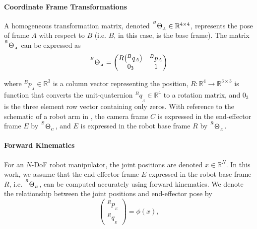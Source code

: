 \paragraph{Coordinate Frame Transformations} A homogeneous transformation matrix, denoted ${}^{^B}\Theta_{_A}\in\mathbb{R}^{4 \times 4}$, represents the pose of frame $A$ with respect to $B$ (i.e. $B$, in this case, is the base frame).
The matrix ${}^{^B}\Theta_{_A}$ can be expressed as
\begin{equation}
{}^{^B}\Theta_{_A} = 
    \begin{pmatrix}
     R\big({}^{B}q_A\big) & {}^{B}p_A \\
     0_3 & 1
    \end{pmatrix}
\end{equation}

where ${}^{B}p_{_A}\in\mathbb{R}^3$ is a column vector representing the position, $R:\mathbb{R}^4\rightarrow\mathbb{R}^{3\times 3}$ is function that converts the unit-quaternion ${}^{B}q_{_A}\in\mathbb{R}^4$ to a rotation matrix, and $0_3$ is the three element row vector containing only zeros.
With reference to the schematic of a robot arm in , the camera frame $C$ is expressed in the end-effector frame $E$ by ${}^{^E}\Theta_{_C}$, and $E$ is expressed in the robot base frame $R$ by ${}^{^R}\Theta_{_E}$. 

\paragraph{Forward Kinematics} For an $N$-DoF robot manipulator, the joint positions are denoted $x\in\mathbb{R}^N$. In this work, we assume that the end-effector frame $E$ expressed in the robot base frame $R$, i.e. ${}^{^R}\Theta_{_E}$, can be computed accurately using forward kinematics. We denote the relationship between the joint positions and end-effector pose by
\begin{equation}
    \begin{pmatrix}
         {}^{R}p_{_E}\\
         {}^{R}q_{_E}
    \end{pmatrix}
    = \phi(x),
\end{equation}

